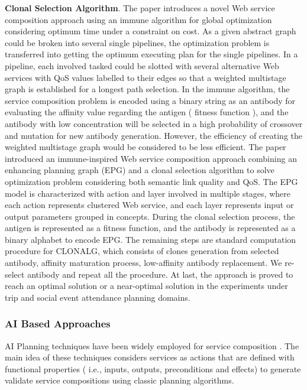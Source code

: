 \textbf{Clonal Selection Algorithm}.
The paper \cite{yan2006immune} introduces a novel Web service composition approach using an immune algorithm for global optimization considering optimum time under a constraint on cost. As a given abstract graph could be broken into several single pipelines, the optimization problem is transferred into getting the optimum executing plan for the single pipelines. In a pipeline, each involved tasked could be slotted with several alternative Web services with QoS values labelled to their edges so that a weighted multistage graph is established for a longest path selection. In the immune algorithm, the service composition problem is encoded using a binary string as an antibody for evaluating the affinity value regarding the antigen ( fitness function ), and the antibody with low concentration will be selected in a high probability of crossover and mutation for new antibody generation. However, the efficiency of creating the weighted multistage graph would be considered to be less efficient. The paper \cite{pop2009immune} introduced an immune-inspired Web service composition approach combining an enhancing planning graph (EPG) and a clonal selection algorithm to solve optimization problem considering both semantic link quality and QoS.  The EPG model is characterized with action and layer involved in multiple stages, where each action represents clustered Web service, and each layer represents input or output parameters grouped in concepts.   During the clonal selection process, the antigen is represented as a fitness function, and the antibody is represented as a binary alphabet to encode EPG.  The remaining steps are standard computation procedure for CLONALG, which consists of clones generation from selected antibody, affinity maturation process, low-affinity antibody replacement. We re-select antibody and repeat all the procedure. At last, the approach is proved to reach an optimal solution or a near-optimal solution in the experiments under trip and social event attendance planning domains.

\subsubsection{AI Based Approaches}

AI Planning techniques have been widely employed for service composition \cite{markou2015non,peer2005Web}. The main idea of these techniques considers services as actions that are defined with functional properties ( i.e., inputs, outputs, preconditions and effects) to generate validate service compositions using classic planning algorithms. 

